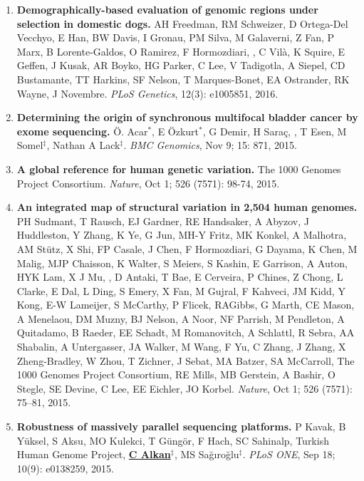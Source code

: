 \begin{enumerate}
  \item        
  {\bf Demographically-based evaluation of genomic regions under selection in domestic dogs.}
AH Freedman, RM Schweizer, D Ortega-Del Vecchyo, E Han, BW Davis, I Gronau, PM Silva, M Galaverni, Z Fan, P Marx, B Lorente-Galdos, O Ramirez, F Hormozdiari, \calkan{}, C Vilà, K Squire, 
E Geffen, J Kusak, AR Boyko, HG Parker, C Lee, V Tadigotla, A Siepel, CD Bustamante, TT Harkins, SF Nelson, T Marques-Bonet, EA Ostrander, RK Wayne, J Novembre.
 {\em PLoS Genetics}, 12(3): e1005851, 2016.

  \item        
  {\bf Determining the origin of synchronous multifocal bladder cancer by exome sequencing.} 
  Ö. Acar$^*$, E Özkurt$^*$, G Demir, H Saraç, \calkan{}, T Esen, M Somel$^\ddag$, Nathan A Lack$^\ddag$.
 {\em BMC Genomics}, Nov 9;  15: 871, 2015.

  \item        
  {\bf A global reference for human genetic variation.} The 1000 Genomes Project Consortium.  {\em Nature}, Oct 1;  526 (7571): 98-74, 2015.


  \item        
  {\bf An integrated map of structural variation in 2,504 human genomes.}
  PH Sudmant, T Rausch, EJ Gardner,  RE Handsaker, A Abyzov, J Huddleston, Y Zhang, K Ye, G Jun, MH-Y Fritz, MK Konkel, A Malhotra, AM Stütz, X Shi, FP Casale, J Chen, 
  F Hormozdiari, G Dayama, K Chen, M Malig, MJP Chaisson, K Walter, S Meiers, S Kashin, E Garrison, A Auton, HYK Lam, X J Mu, \calkan, D Antaki, T Bae, E Cerveira, P Chines, Z Chong, 
  L Clarke, E Dal, L Ding, S Emery, X Fan, M Gujral, F Kahveci, JM Kidd, Y Kong, E-W Lameijer, S McCarthy, P Flicek, RAGibbs, G Marth, CE Mason, A Menelaou, DM Muzny, 
  BJ Nelson, A Noor, NF Parrish, M Pendleton, A Quitadamo, B Raeder, EE Schadt, M Romanovitch, A Schlattl, R Sebra, AA Shabalin, A Untergasser, 
  JA Walker, M Wang, F Yu, C Zhang, J Zhang, X Zheng-Bradley, W Zhou, T Zichner, J Sebat, MA Batzer, SA McCarroll, 
  The 1000 Genomes Project Consortium, RE Mills, MB Gerstein, A Bashir, O Stegle, SE Devine, C Lee, EE Eichler, JO Korbel. 
  {\em Nature}, Oct 1;  526 (7571): 75–81, 2015.

  \item        
  {\bf Robustness of massively parallel sequencing platforms.}
  P Kavak, B Yüksel, S Aksu, MO Kulekci, T Güngör, F Hach, SC Sahinalp, Turkish Human Genome Project, {\bf {\underline {C Alkan}}}$^\ddag$,
  MS Sağıroğlu$^\ddag$.    
  {\em PLoS ONE},  Sep 18; 10(9): e0138259, 2015.  


\end{enumerate}
